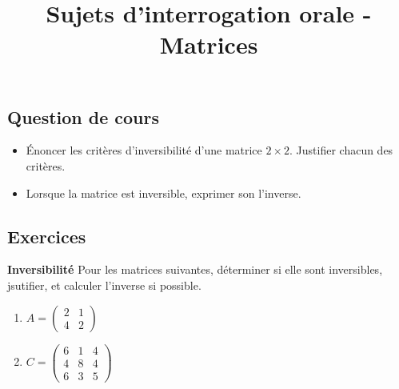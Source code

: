 \documentclass[10pt,a4paper]{article}
\title{Sujets d'interrogation orale - Matrices}
\author{}
\date{}
\begin{document}
\maketitle

\subsection*{Question de cours}
\begin{itemize}
    \item Énoncer les critères d'inversibilité d'une matrice $2 \times 2$. Justifier chacun des critères.
    \item Lorsque la matrice est inversible, exprimer son l'inverse.
\end{itemize}

\bigskip

\subsection*{Exercices}

\textbf{Inversibilité}
Pour les matrices suivantes, déterminer si elle sont inversibles, jsutifier, et calculer l'inverse
si possible.
\begin{enumerate}
    \item $A = \begin{pmatrix} 2 & 1 \\ 4 & 2 \end{pmatrix}$
    \item $C = \begin{pmatrix}
        6 & 1 & 4 \\
        4 & 8 & 4 \\
        6 & 3 & 5
        \end{pmatrix}$
\end{enumerate}

\bigskip
\end{document}
